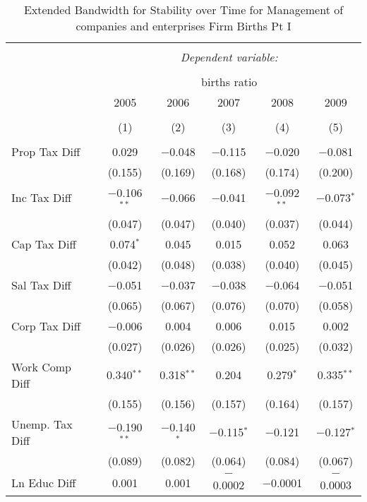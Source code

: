 
\begin{table}[!htbp] \centering 
  \caption{Extended Bandwidth for Stability over Time for  Management of companies and enterprises Firm Births Pt I} 
  \label{55year_eb} 
\small 
\begin{tabular}{@{\extracolsep{5pt}}lccccc} 
\\[-1.8ex]\hline 
\hline \\[-1.8ex] 
 & \multicolumn{5}{c}{\textit{Dependent variable:}} \\ 
\cline{2-6} 
\\[-1.8ex] & \multicolumn{5}{c}{births ratio} \\ 
 & 2005 & 2006 & 2007 & 2008 & 2009 \\ 
\\[-1.8ex] & (1) & (2) & (3) & (4) & (5)\\ 
\hline \\[-1.8ex] 
 Prop Tax Diff & 0.029 & $-$0.048 & $-$0.115 & $-$0.020 & $-$0.081 \\ 
  & (0.155) & (0.169) & (0.168) & (0.174) & (0.200) \\ 
  Inc Tax Diff & $-$0.106$^{**}$ & $-$0.066 & $-$0.041 & $-$0.092$^{**}$ & $-$0.073$^{*}$ \\ 
  & (0.047) & (0.047) & (0.040) & (0.037) & (0.044) \\ 
  Cap Tax Diff & 0.074$^{*}$ & 0.045 & 0.015 & 0.052 & 0.063 \\ 
  & (0.042) & (0.048) & (0.038) & (0.040) & (0.045) \\ 
  Sal Tax Diff & $-$0.051 & $-$0.037 & $-$0.038 & $-$0.064 & $-$0.051 \\ 
  & (0.065) & (0.067) & (0.076) & (0.070) & (0.058) \\ 
  Corp Tax Diff & $-$0.006 & 0.004 & 0.006 & 0.015 & 0.002 \\ 
  & (0.027) & (0.026) & (0.026) & (0.025) & (0.032) \\ 
  Work Comp Diff & 0.340$^{**}$ & 0.318$^{**}$ & 0.204 & 0.279$^{*}$ & 0.335$^{**}$ \\ 
  & (0.155) & (0.156) & (0.157) & (0.164) & (0.157) \\ 
  Unemp. Tax Diff & $-$0.190$^{**}$ & $-$0.140$^{*}$ & $-$0.115$^{*}$ & $-$0.121 & $-$0.127$^{*}$ \\ 
  & (0.089) & (0.082) & (0.064) & (0.084) & (0.067) \\ 
  Ln Educ Diff & 0.001 & 0.001 & $-$0.0002 & $-$0.0001 & $-$0.0003 \\ 

\end{tabular}
\end{table}
